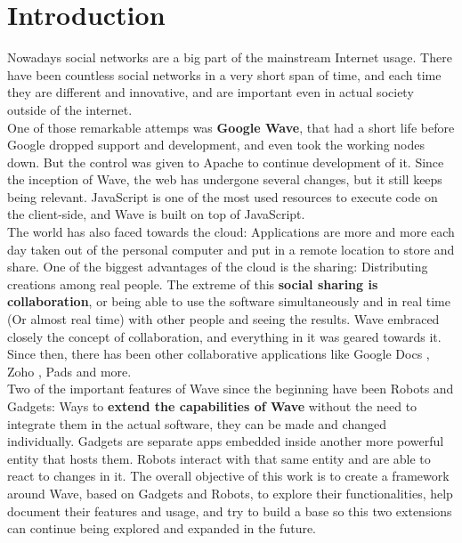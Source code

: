 \newpage
{}

\section{Introduction}
Nowadays social networks are a big part of the mainstream Internet usage. There have been countless social networks in a very short span of time, and each time they are different and innovative, and are important even in actual society outside of the internet.\\[.2cm]
One of those remarkable attemps was \textbf{Google Wave}, that had a short life before Google dropped support and development, and even took the working nodes down. But the control was given to Apache to continue development of it. Since the inception of Wave, the web has undergone several changes, but it still keeps being relevant. JavaScript is one of the most used resources to execute code on the client-side, and Wave is built on top of JavaScript.\\[.2cm]
The world has also faced towards the cloud: Applications are more and more each day taken out of the personal computer and put in a remote location to store and share. One of the biggest advantages of the cloud is the sharing: Distributing creations among real people. The extreme of this \textbf{social sharing is collaboration}, or being able to use the software simultaneously and in real time (Or almost real time) with other people and seeing the results. Wave embraced closely the concept of collaboration, and everything in it was geared towards it. Since then, there has been other collaborative applications like Google Docs \cite{ref:google_docs}, Zoho \cite{ref:zoho}, Pads and more.\\[.2cm]
Two of the important features of Wave since the beginning have been Robots and Gadgets: Ways to \textbf{extend the capabilities of Wave} without the need to integrate them in the actual software, they can be made and changed individually. Gadgets are separate apps embedded inside another more powerful entity that hosts them. Robots interact with that same entity and are able to react to changes in it. The overall objective of this work is to create a framework around Wave, based on Gadgets and Robots, to explore their functionalities, help document their features and usage, and try to build a base so this two extensions can continue being explored and expanded in the future.

